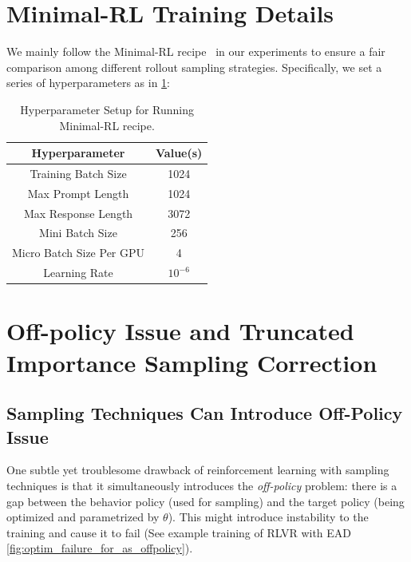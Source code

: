 \appendix
\section{Minimal-RL Training Details}
\label{app: minimal_rl_training_details}
We mainly follow the Minimal-RL recipe~\citep{xiong2025minimalist} in our experiments to ensure a fair comparison among different rollout sampling strategies. Specifically, we set a series of hyperparameters as in \cref{tab: hyperparameter}:

\begin{table}[h!]
\centering
\begin{tabular}{@{}cc@{}}
\toprule
Hyperparameter                                 & Value(s)        \\ 
\midrule
\multicolumn{1}{c}{Training Batch Size}      & \multicolumn{1}{c}{1024} \\ 
\multicolumn{1}{c}{Max Prompt Length}        & \multicolumn{1}{c}{1024} \\ 
\multicolumn{1}{c}{Max Response Length}      & \multicolumn{1}{c}{3072} \\ 
\multicolumn{1}{c}{Mini Batch Size}          & \multicolumn{1}{c}{256}  \\ 
\multicolumn{1}{c}{Micro Batch Size Per GPU} & \multicolumn{1}{c}{4}    \\ 
\multicolumn{1}{c}{Learning Rate}            & \multicolumn{1}{c}{$10^{-6}$} \\ 
\bottomrule
\end{tabular}%
\caption{Hyperparameter Setup for Running Minimal-RL recipe. }
\label{tab: hyperparameter}
\end{table}

\section{Off-policy Issue and Truncated Importance Sampling Correction}
\label{sec:off-policy}
\subsection{Sampling Techniques Can Introduce Off-Policy Issue}
\label{subsec:temperature-sampling}
One subtle yet troublesome drawback of reinforcement learning with sampling techniques is that it simultaneously introduces the \emph{off-policy} problem: there is a gap between the behavior policy (used for sampling) and the target policy (being optimized and parametrized by $\theta$). This might introduce instability to the training and cause it to fail (See example training of RLVR with EAD \cref{fig:optim_failure_for_as_offpolicy}).

